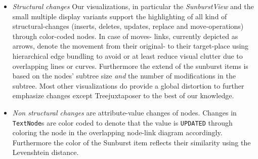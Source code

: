 \begin{itemize}
\item \emph{Structural changes} Our visualizations, in particular the \emph{SunburstView} and the small multiple display variants support the highlighting of all kind of structural-changes (inserts, deletes, updates, replace and move-operations) through color-coded nodes. In case of moves- links, currently depicted as arrows, denote the movement from their original- to their target-place using hierarchical edge bundling to avoid or at least reduce visual clutter due to overlapping lines or curves. Furthermore the extend of the sunburst items is based on the nodes' subtree size \emph{and} the number of modifications in the subtree. Most other visualizations do provide a global distortion to further emphasize changes except Treejuxtaposer to the best of our knowledge.
\item \emph{Non structural changes} are attribute-value changes of nodes. Changes in \texttt{TextNode}s are color coded to denote that the value is \texttt{UPDATED} through coloring the node in the overlapping node-link diagram accordingly. Furthermore the color of the Sunburst item reflects their similarity using the Levenshtein distance.

\end{itemize}
